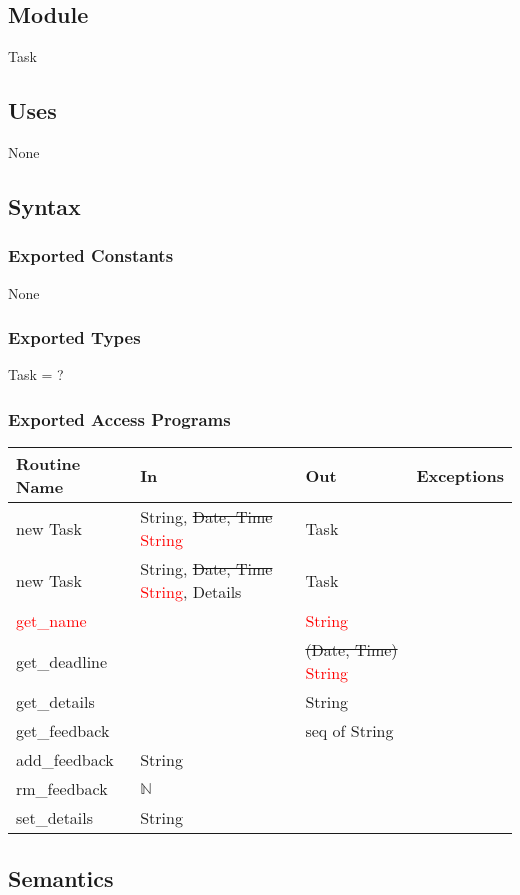 \documentclass[12pt, titlepage]{article}
\begin{document}
\subsection*{Module}
Task

\subsection*{Uses}
None

\subsection* {Syntax}
\subsubsection* {Exported Constants}
None

\subsubsection* {Exported Types}
Task = ?

\subsubsection* {Exported Access Programs}
\begin{tabular}{|l|l|l|l|}
    \hline
    \textbf{Routine Name} & \textbf{In} & \textbf{Out} & \textbf{Exceptions} \\
    \hline
    new Task & String, \sout{Date, Time} \textcolor{red}{String} & Task & \\
    \hline
    new Task & String, \sout{Date, Time} \textcolor{red}{String}, Details & Task & \\
    \hline
    \textcolor{red}{get\_name} & & \textcolor{red}{String} & \\
    \hline
    get\_deadline & & \sout{(Date, Time)} \textcolor{red}{String} & \\
    \hline
    get\_details & & String & \\
    \hline
    get\_feedback & & seq of String& \\
    \hline
    add\_feedback & String & & \\
    \hline
    rm\_feedback & $\mathbb{N}$ &&\\
    \hline
    set\_details & String & & \\
    \hline
\end{tabular}

\subsection*{Semantics}
\end{document}
